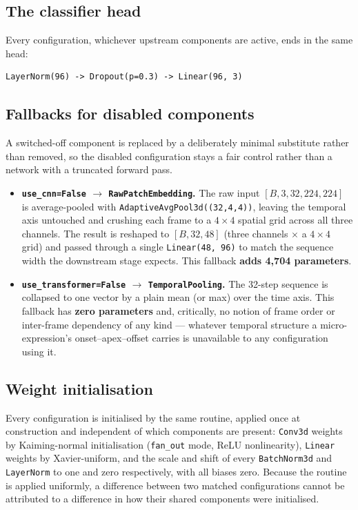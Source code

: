 \subsection{The classifier head}
\label{sec:classifier-head}

Every configuration, whichever upstream components are active, ends in the same head:

\begin{verbatim}
LayerNorm(96) -> Dropout(p=0.3) -> Linear(96, 3)
\end{verbatim}

\subsection{Fallbacks for disabled components}
\label{sec:fallbacks-config}

A switched-off component is replaced by a deliberately minimal substitute rather than removed, so the disabled configuration stays a fair control rather than a network with a truncated forward pass.

\begin{itemize}
	\item \textbf{\texttt{use\_cnn=False} $\rightarrow$ \texttt{RawPatchEmbedding}.} The raw input $[B,3,32,224,224]$ is average-pooled with \texttt{AdaptiveAvgPool3d((32,4,4))}, leaving the temporal axis untouched and crushing each frame to a $4 \times 4$ spatial grid across all three channels. The result is reshaped to $[B,32,48]$ (three channels $\times$ a $4 \times 4$ grid) and passed through a single \texttt{Linear(48, 96)} to match the sequence width the downstream stage expects. This fallback \textbf{adds 4,704 parameters}.
	\item \textbf{\texttt{use\_transformer=False} $\rightarrow$ \texttt{TemporalPooling}.} The 32-step sequence is collapsed to one vector by a plain mean (or max) over the time axis. This fallback has \textbf{zero parameters} and, critically, no notion of frame order or inter-frame dependency of any kind --- whatever temporal structure a micro-expression's onset--apex--offset carries is unavailable to any configuration using it.
\end{itemize}

\subsection{Weight initialisation}
\label{sec:weight-init}

Every configuration is initialised by the same routine, applied once at construction and independent of which components are present: \texttt{Conv3d} weights by Kaiming-normal initialisation (\texttt{fan\_out} mode, ReLU nonlinearity), \texttt{Linear} weights by Xavier-uniform, and the scale and shift of every \texttt{BatchNorm3d} and \texttt{LayerNorm} to one and zero respectively, with all biases zero. Because the routine is applied uniformly, a difference between two matched configurations cannot be attributed to a difference in how their shared components were initialised.

